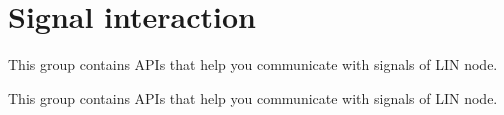 \hypertarget{group__signal__interract__group}{}\section{Signal interaction}
\label{group__signal__interract__group}


This group contains A\+P\+Is that help you communicate with signals of L\+I\+N node.  


This group contains A\+P\+Is that help you communicate with signals of L\+I\+N node. 

